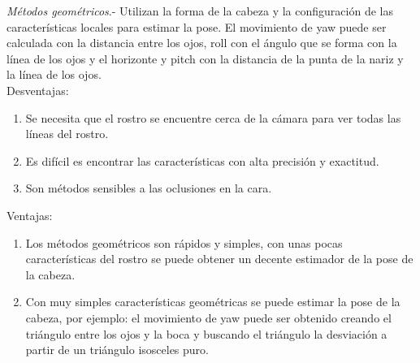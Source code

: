 \begin{itemize}
   	\textit{Métodos geométricos}.- Utilizan la forma de la cabeza y la configuración de las características locales para estimar la pose. El movimiento de yaw puede ser calculada con la distancia entre los ojos, roll con el ángulo que se forma con la línea de los ojos y el horizonte y pitch con la distancia de la punta de la nariz y la línea de los ojos.
   	\\Desventajas:
   	\begin{enumerate}[label=(\alph*)]
   		\item Se necesita que el rostro se encuentre cerca de la cámara para ver todas las líneas del rostro.
   		\item Es difícil es encontrar las características con alta precisión y exactitud.
   		\item Son métodos sensibles a las oclusiones en la cara.
   	\end{enumerate}
   	Ventajas:
   	\begin{enumerate}[label=(\alph*)]
   		\item Los métodos geométricos son rápidos y simples, con unas pocas características del rostro se puede obtener un decente estimador de la pose de la cabeza.
   		\item Con muy simples características geométricas se puede estimar la pose de la cabeza, por ejemplo: el movimiento de yaw puede ser obtenido creando el triángulo entre los ojos y la boca y buscando el triángulo la desviación a partir de un triángulo isosceles puro.
   	\end{enumerate}
   	
   	
   	
   \end{itemize}
